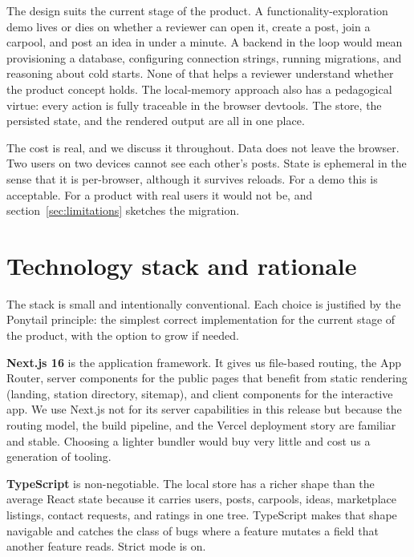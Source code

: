 \documentclass[a4paper,11pt]{article}
\begin{document}
The design suits the current stage of the product. A functionality-exploration
demo lives or dies on whether a reviewer can open it, create a post, join a
carpool, and post an idea in under a minute. A backend in the loop would mean
provisioning a database, configuring connection strings, running migrations,
and reasoning about cold starts. None of that helps a reviewer understand
whether the product concept holds. The local-memory approach also has a
pedagogical virtue: every action is fully traceable in the browser devtools.
The store, the persisted state, and the rendered output are all in one place.

The cost is real, and we discuss it throughout. Data does not leave the
browser. Two users on two devices cannot see each other's posts. State is
ephemeral in the sense that it is per-browser, although it survives reloads.
For a demo this is acceptable. For a product with real users it would not be,
and section~\ref{sec:limitations} sketches the migration.


\section{Technology stack and rationale}

The stack is small and intentionally conventional. Each choice is justified by
the Ponytail principle: the simplest correct implementation for the current
stage of the product, with the option to grow if needed.

\textbf{Next.js 16} is the application framework. It gives us file-based
routing, the App Router, server components for the public pages that benefit
from static rendering (landing, station directory, sitemap), and client
components for the interactive app. We use Next.js not for its server
capabilities in this release but because the routing model, the build
pipeline, and the Vercel deployment story are familiar and stable. Choosing a
lighter bundler would buy very little and cost us a generation of tooling.

\textbf{TypeScript} is non-negotiable. The local store has a richer shape
than the average React state because it carries users, posts, carpools, ideas,
marketplace listings, contact requests, and ratings in one tree. TypeScript
makes that shape navigable and catches the class of bugs where a feature
mutates a field that another feature reads. Strict mode is on.
\end{document}
